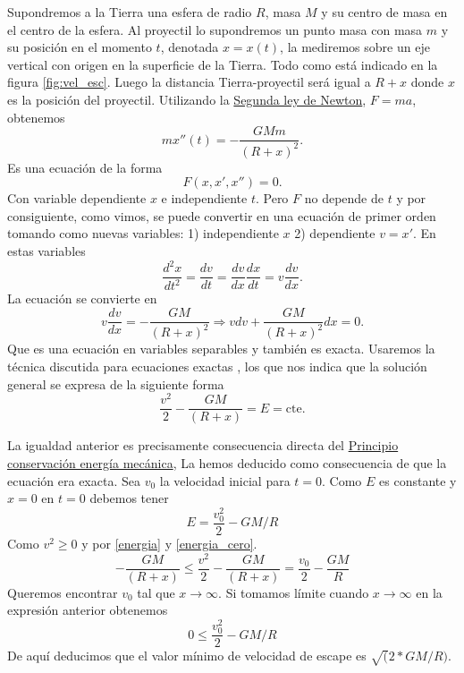 Supondremos a la Tierra una esfera de radio $R$, masa $M$ y su centro de masa en el centro de la esfera.   Al proyectil lo supondremos un punto masa
con masa $m$ y su posición en el momento $t$, denotada $x=x(t)$, la mediremos sobre un eje vertical con origen en la
superficie de la Tierra.  Todo como está indicado en la figura \ref{fig:vel_esc}.
Luego la distancia Tierra-proyectil será igual a $R+x$ donde $x$ es la posición del proyectil. Utilizando la 
\href{http://es.wikipedia.org/wiki/Leyes_de_Newton\#Segunda_ley_de_Newton_o_ley_de_fuerza}{Segunda ley de Newton},
$F=ma$, obtenemos
\[mx''(t)=-\frac{GMm}{(R+x)^2}.\]
Es una ecuación de la forma
\[F(x,x',x'')=0.\]
Con variable dependiente $x$ e independiente $t$. Pero  $F$ no depende de $t$ y por consiguiente, como vimos, se puede convertir en una ecuación de primer orden
tomando como nuevas variables: 1) independiente $x$ 2) dependiente $v=x'$. En estas variables
\[\frac{d^2x}{dt^2}=\frac{dv}{dt}=\frac{dv}{dx}\frac{dx}{dt}=v\frac{dv}{dx}.\]
La ecuación se convierte en
\[v\frac{dv}{dx}=-\frac{GM}{(R+x)^2}\Longrightarrow vdv+\frac{GM}{(R+x)^2}dx=0.\]
Que es una ecuación en variables separables y también es exacta. Usaremos la técnica discutida para
ecuaciones exactas , los que nos indica que la solución general se expresa de la siguiente forma
\begin{equation}\label{energia}
 \frac{v^2}{2}-\frac{GM}{(R+x)}=E=\text{cte}.
\end{equation}


La igualdad anterior es precisamente  consecuencia directa del \href{https://docs.google.com/file/d/0B80iJ0HgObRRWll6MlJFSjFNMGc/edit}{Principio conservación energía mecánica},
La hemos deducido como consecuencia de que la ecuación era exacta. 
Sea $v_0$ la velocidad inicial para $t=0$. 
Como $E$ es constante y $x=0$ en $t=0$ debemos tener
\begin{equation}\label{energia_cero}
 E=\frac{v_0^2}{2}-GM/R
\end{equation}
Como $v^2\geq 0$ y por \eqref{energia} y \eqref{energia_cero}.
\[-\frac{GM}{(R+x)}\leq\frac{v^2}{2}-\frac{GM}{(R+x)}=\frac{v_0}{2}-\frac{GM}{R}\]
Queremos encontrar $v_0$ tal que $x\to\infty$. Si tomamos
límite cuando $x\to\infty$ en la expresión anterior obtenemos
\[0\leq \frac{v_0^2}{2}-GM/R\]
De aquí deducimos que el valor mínimo de velocidad de escape es 
$\sqrt(2*GM/R)$.

